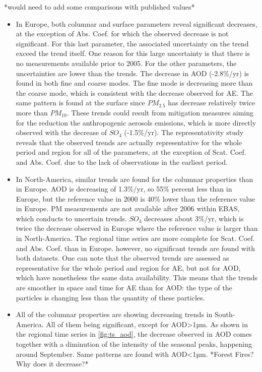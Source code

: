 \documentclass[journal abbreviation, manuscript]{copernicus}
\begin{document}
*would need to add some comparisons with published values*
\begin{itemize}
 \item In Europe, both columnar and surface parameters reveal significant decreases, at the exception of Abs. Coef. for which the observed decrease is not significant. For this last parameter, the associated uncertainty on the trend exceed the trend itself. One reason for this large uncertainty is that there is no measurements available prior to 2005. For the other parameters, the uncertainties are lower than the trends. The decrease in AOD (-2.8\%/yr) is found in both fine and coarse modes. The fine mode is decreasing more than the coarse mode, which is consistent with the decrease observed for AE. The same pattern is found at the surface since $PM_{2.5}$ has decrease relatively twice more than $PM_{10}$. These trends could result from mitigation measures aiming for the reduction the anthropogenic aerosols emissions, which is more directly observed with the decrease of $SO_{4}$ (-1.5\%/yr). The representativity study reveals that the observed trends are actually representative for the whole period and region for all of the parameters, at the exception of Scat. Coef. and Abs. Coef. due to the lack of observations in the earliest period.
 \item In North-America, similar trends are found for the columnar properties than in Europe. AOD is decreasing of 1.3\%/yr, so 55\% percent less than in Europe, but the reference value in 2000 is 40\% lower than the reference value in Europe. PM measurements are not available after 2006 within EBAS, which conducts to uncertain trends. $SO_{4}$ decreases about 3\%/yr, which is twice the decrease observed in Europe where the reference value is larger than in North-America. The regional time series are more complete for Scat. Coef. and Abs. Coef. than in Europe. however, no significant trends are found with both datasets. One can note that the observed trends are assessed as representative for the whole period and region for AE, but not for AOD, which have nonetheless the same data availability. This means that the trends are smoother in space and time for AE than for AOD: the type of the particles is changing less than the quantity of these particles.
 \item All of the columnar properties are showing decreasing trends in South-America. All of them being significant, except for AOD>1µm. As shown in the regional time series in \ref{fig:ts_aod}, the decrease observed in AOD comes together with a diminution of the intensity of the seasonal peaks, happening around September. Same patterns are found with AOD<1µm. *Forest Fires? Why does it decrease?*

\end{itemize}
\end{document}
